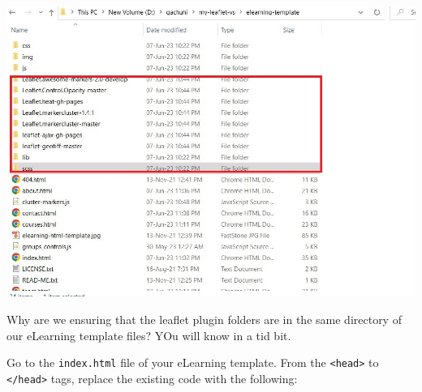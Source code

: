 \documentclass[
]{book}
\begin{document}
\includegraphics[width=13.69in]{../images/elearning-plugins}

Why are we ensuring that the leaflet plugin folders are in the same directory of our eLearning template files? YOu will know in a tid bit.

Go to the \texttt{index.html} file of your eLearning template. From the \texttt{\textless{}head\textgreater{}} to \texttt{\textless{}/head\textgreater{}} tags, replace the existing code with the following:
\end{document}
